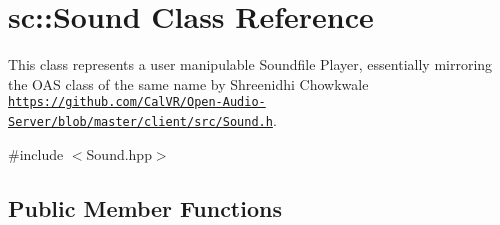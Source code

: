\hypertarget{classsc_1_1Sound}{\section{sc\-:\-:Sound Class Reference}
\label{classsc_1_1Sound}
}


This class represents a user manipulable Soundfile Player, essentially mirroring the O\-A\-S class of the same name by Shreenidhi Chowkwale  \href{https://github.com/CalVR/Open-Audio-Server/blob/master/client/src/Sound.h}{\tt https\-://github.\-com/\-Cal\-V\-R/\-Open-\/\-Audio-\/\-Server/blob/master/client/src/\-Sound.\-h}.  




{\ttfamily \#include $<$Sound.\-hpp$>$}

\subsection*{Public Member Functions}
